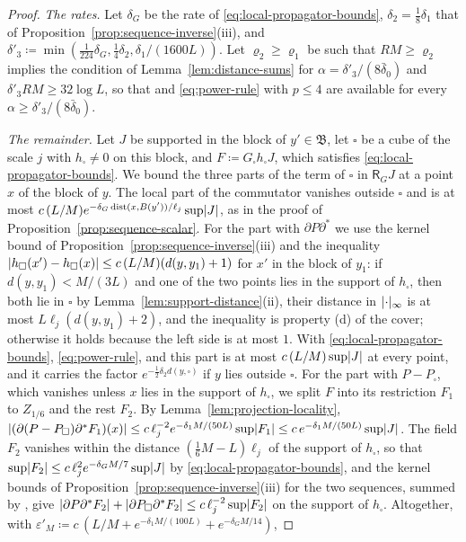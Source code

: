 \documentclass[11pt]{preprint}
\newcommand{\dist}{\operatorname{dist}}
\DeclarePairedDelimiter{\abs}{\lvert}{\rvert}
\numberwithin{equation}{section}
\theoremstyle{definition}
\theoremstyle{remark}
\theoremstyle{plain}
\begin{document}
\begin{proof}
\emph{The rates.} Let $\delta_G$ be the rate of \eqref{eq:local-propagator-bounds}, $\delta_2 = \frac18\delta_1$ that of Proposition~\ref{prop:sequence-inverse}(iii), and $\delta'_3 \coloneqq \min(\frac{1}{224}\delta_G, \frac14\delta_2, \delta_1/(1600L))$. Let $\varrho_2 \geq \varrho_1$ be such that $RM \geq \varrho_2$ implies the condition of Lemma~\ref{lem:distance-sums} for $\alpha = \delta'_3/(8\bar\delta_0)$ and $\delta'_3RM \geq 32\log L$, so that \cite[(2.61)]{BalabanPRT2} and \eqref{eq:power-rule} with $p \leq 4$ are available for every $\alpha \geq \delta'_3/(8\bar\delta_0)$.

\emph{The remainder.} Let $J$ be supported in the block of $y' \in \mathfrak B$, let $\square$ be a cube of the scale $j$ with $h_\square \neq 0$ on this block, and $F \coloneqq G_\square h_\square J$, which satisfies \eqref{eq:local-propagator-bounds}. We bound the three parts of the term of $\square$ in $\mathsf R_GJ$ at a point $x$ of the block of $y$. The local part of the commutator vanishes outside $\square$ and is at most $c\,(L/M)e^{-\delta_G\dist(x, B(y'))/\ell_j}\sup\abs J$, as in the proof of Proposition~\ref{prop:sequence-scalar}. For the part with $\partial P\partial^*$ we use the kernel bound of Proposition~\ref{prop:sequence-inverse}(iii) and the inequality $\abs{h_\square(x') - h_\square(x)} \leq c\,(L/M)(d(y, y_1) + 1)$ for $x'$ in the block of $y_1$: if $d(y, y_1) < M/(3L)$ and one of the two points lies in the support of $h_\square$, then both lie in $\square$ by Lemma~\ref{lem:support-distance}(ii), their distance in $\abs\cdot_\infty$ is at most $L\ell_j(d(y, y_1) + 2)$, and the inequality is property (d) of the cover; otherwise it holds because the left side is at most $1$. With \eqref{eq:local-propagator-bounds}, \eqref{eq:power-rule}, and \cite[(2.61)]{BalabanPRT2} this part is at most $c\,(L/M)\sup\abs J$ at every point, and it carries the factor $e^{-\frac12\delta_2d(y, \square)}$ if $y$ lies outside $\square$. For the part with $P - P_\square$, which vanishes unless $x$ lies in the support of $h_\square$, we split $F$ into its restriction $F_1$ to $Z_{1/6}$ and the rest $F_2$. By Lemma~\ref{lem:projection-locality}, $\abs{(\partial(P - P_\square)\partial^*F_1)(x)} \leq c\,\ell_j^{-2}e^{-\delta_1M/(50L)}\sup\abs{F_1} \leq c\,e^{-\delta_1M/(50L)}\sup\abs J$. The field $F_2$ vanishes within the distance $(\frac16M - L)\ell_j$ of the support of $h_\square$, so that $\sup\abs{F_2} \leq c\,\ell_j^2e^{-\delta_GM/7}\sup\abs J$ by \eqref{eq:local-propagator-bounds}, and the kernel bounds of Proposition~\ref{prop:sequence-inverse}(iii) for the two sequences, summed by \cite[(2.61)]{BalabanPRT2}, give $\abs{\partial P\partial^*F_2} + \abs{\partial P_\square\partial^*F_2} \leq c\,\ell_j^{-2}\sup\abs{F_2}$ on the support of $h_\square$. Altogether, with $\varepsilon'_M \coloneqq c\,(L/M + e^{-\delta_1M/(100L)} + e^{-\delta_GM/14})$,

\end{proof}
\end{document}
